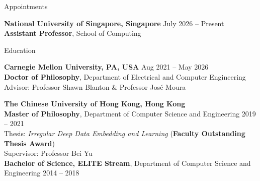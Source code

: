 


\begin{rSection}{Appointments}

    {\bf \textcolor{CUHKblue}{National University of Singapore}, Singapore} \hfill {July 2026 -- Present} \\ 
    \textbf{Assistant Professor}, School of Computing 
\end{rSection}    


\begin{rSection}{Education}

    {\bf \textcolor{CUHKblue}{Carnegie Mellon University}, PA, USA} \hfill {Aug 2021 -- May 2026} \\ 
    \textbf{Doctor of Philosophy}, Department of Electrical and Computer Engineering  \\
    {\small \hspace*{2em} Advisor: Professor Shawn Blanton \& Professor José Moura}
    
    {\bf \textcolor{CUHKblue}{The Chinese University of Hong Kong}, Hong Kong} \\ 
    \textbf{Master of Philosophy}, Department of Computer Science and Engineering \hfill {2019 -- 2021} \\
    {\small \hspace*{2em} Thesis: \textit{Irregular Deep Data Embedding and Learning} (\textbf{Faculty Outstanding Thesis Award}) \\
    \hspace*{2em} Supervisor: Professor Bei Yu} \\
    \textbf{Bachelor of Science, ELITE Stream}, Department of Computer Science and Engineering \hfill {2014 -- 2018}
    
    \end{rSection}



